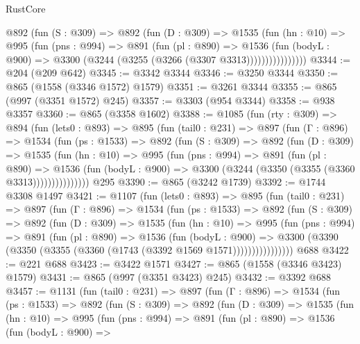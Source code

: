 \begin{lexlean}{RustCore}
\begin{coremodule}
{\begin{coremodule}
{{{{{{{{              @892
                (fun (S : @309) =>
                @892
                  (fun (D : @309) =>
                  @1535
                    (fun (hn : @10) =>
                    @995
                      (fun (pns : @994) =>
                      @891
                        (fun (pl : @890) =>
                        @1536
                          (fun (bodyL : @900) =>
                          @3300 (@3244 (@3255 (@3266 (@3307 @3313))))))))))))))))
@3344 := @204 (@209 @642)
@3345 := @3342 @3344
@3346 := @3250 @3344
@3350 := @865 (@1558 (@3346 @1572) @1579)
@3351 := @3261 @3344
@3355 := @865 (@997 (@3351 @1572) @245)
@3357 := @3303 (@954 @3344)
@3358 := @938 @3357
@3360 := @865 (@3358 @1602)
@3388 := @1085
    (fun (rty : @309) =>
    @894
      (fun (lets0 : @893) =>
      @895
        (fun (tail0 : @231) =>
        @897
          (fun (Γ : @896) =>
          @1534
            (fun (ps : @1533) =>
            @892
              (fun (S : @309) =>
              @892
                (fun (D : @309) =>
                @1535
                  (fun (hn : @10) =>
                  @995
                    (fun (pns : @994) =>
                    @891
                      (fun (pl : @890) =>
                      @1536
                        (fun (bodyL : @900) =>
                        @3300 (@3244 (@3350 (@3355 (@3360 @3313)))))))))))))))
    @295
@3390 := @865 (@3242 @1739)
@3392 := @1744 @3308 @1497
@3421 := @1107
    (fun (lets0 : @893) =>
    @895
      (fun (tail0 : @231) =>
      @897
        (fun (Γ : @896) =>
        @1534
          (fun (ps : @1533) =>
          @892
            (fun (S : @309) =>
            @892
              (fun (D : @309) =>
              @1535
                (fun (hn : @10) =>
                @995
                  (fun (pns : @994) =>
                  @891
                    (fun (pl : @890) =>
                    @1536
                      (fun (bodyL : @900) =>
                      @3300 (@3390 (@3350 (@3355 (@3360 (@1743 (@3392 @1569 @1571))))))))))))))))
    @688
@3422 := @221 @688
@3423 := @3422 @1571
@3427 := @865 (@1558 (@3346 @3423) @1579)
@3431 := @865 (@997 (@3351 @3423) @245)
@3432 := @3392 @688
@3457 := @1131
    (fun (tail0 : @231) =>
    @897
      (fun (Γ : @896) =>
      @1534
        (fun (ps : @1533) =>
        @892
          (fun (S : @309) =>
          @892
            (fun (D : @309) =>
            @1535
              (fun (hn : @10) =>
              @995
                (fun (pns : @994) =>
                @891
                  (fun (pl : @890) =>
                  @1536
                    (fun (bodyL : @900) =>
}}}}}}}}
\end{coremodule}}
\end{coremodule}
\end{lexlean}
